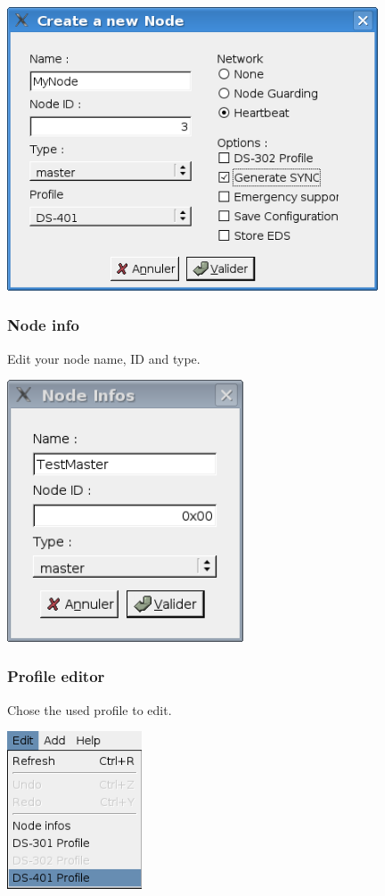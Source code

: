 \documentclass[12pt,twoside]{article}
\begin{document}
 \begin{center}
   \includegraphics[width=11cm]{Pictures/10000201000001CB0000015F4FC09B68.png}
\end{center}

\subsubsection{Node info}
Edit your node name, ID and type.

 \begin{center}
   \includegraphics[width=7cm]{Pictures/10000201000001010000011DA724D25C.png}
\end{center}

\subsubsection{Profile editor}
Chose the used profile to edit.\newline
 \begin{center}
   \includegraphics[width=4cm]{Pictures/10000000000000AB000000C88F594413.png}
\end{center}
\end{document}
